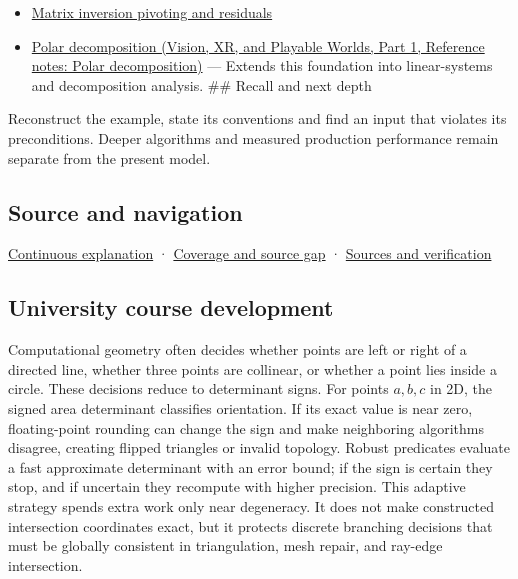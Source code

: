 \hypertarget{appendix-da478be01d02-used-by}{}

\begin{itemize}
\tightlist
\item
  \hyperref[appendix-48d2e66378ab]{Matrix inversion pivoting and residuals}
\item
  \href{../07-Vision-XR-and-Playable-Worlds-P01/main.pdf\#nameddest=appendix-73f5bcf7a462}{Polar decomposition (Vision, XR, and Playable Worlds, Part 1, Reference notes: Polar decomposition)} --- Extends this foundation into linear-systems and decomposition analysis. \#\# Recall and next depth
\end{itemize}

Reconstruct the example, state its conventions and find an input that violates its preconditions. Deeper algorithms and measured production performance remain separate from the present model.

\subsection{Source and navigation}\label{appendix-da478be01d02-source-and-navigation}

\hypertarget{appendix-da478be01d02-source-and-navigation}{}

\hyperref[01-foundations-i-ch018-keep-the-promises-visible-while-moving-between-representations]{Continuous explanation} · \hyperref[appendix-fd090d982a15-phase-7---parts-601-700]{Coverage and source gap} · \hyperref[appendix-a103e7846d21-phase-7---source-analysis-and-verification]{Sources and verification}

\subsection{University course development}\label{appendix-da478be01d02-university-course-development}

\hypertarget{appendix-da478be01d02-university-course-development}{}

Computational geometry often decides whether points are left or right of a directed line, whether three points are collinear, or whether a point lies inside a circle. These decisions reduce to determinant signs. For points \(a,b,c\) in 2D, the signed area determinant classifies orientation. If its exact value is near zero, floating-point rounding can change the sign and make neighboring algorithms disagree, creating flipped triangles or invalid topology. Robust predicates evaluate a fast approximate determinant with an error bound; if the sign is certain they stop, and if uncertain they recompute with higher precision. This adaptive strategy spends extra work only near degeneracy. It does not make constructed intersection coordinates exact, but it protects discrete branching decisions that must be globally consistent in triangulation, mesh repair, and ray-edge intersection.

